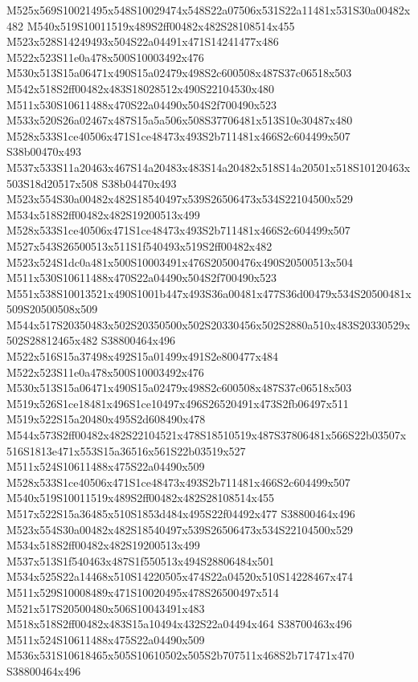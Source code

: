 \documentclass{article}
\begin{document}
\begin{multicols}{2}
M525x569S10021495x548S10029474x548S22a07506x531S22a11481x531S30a00482x482 M540x519S10011519x489S2ff00482x482S28108514x455 M523x528S14249493x504S22a04491x471S14241477x486 M522x523S11e0a478x500S10003492x476 M530x513S15a06471x490S15a02479x498S2c600508x487S37c06518x503 M542x518S2ff00482x483S18028512x490S22104530x480 M511x530S10611488x470S22a04490x504S2f700490x523 M533x520S26a02467x487S15a5a506x508S37706481x513S10e30487x480 M528x533S1ce40506x471S1ce48473x493S2b711481x466S2c604499x507 S38b00470x493 M537x533S11a20463x467S14a20483x483S14a20482x518S14a20501x518S10120463x503S18d20517x508 S38b04470x493 M523x554S30a00482x482S18540497x539S26506473x534S22104500x529 M534x518S2ff00482x482S19200513x499 M528x533S1ce40506x471S1ce48473x493S2b711481x466S2c604499x507 M527x543S26500513x511S1f540493x519S2ff00482x482 M523x524S1dc0a481x500S10003491x476S20500476x490S20500513x504 M511x530S10611488x470S22a04490x504S2f700490x523 M551x538S10013521x490S1001b447x493S36a00481x477S36d00479x534S20500481x509S20500508x509 M544x517S20350483x502S20350500x502S20330456x502S2880a510x483S20330529x502S28812465x482 S38800464x496 M522x516S15a37498x492S15a01499x491S2e800477x484 M522x523S11e0a478x500S10003492x476 M530x513S15a06471x490S15a02479x498S2c600508x487S37c06518x503 M519x526S1ce18481x496S1ce10497x496S26520491x473S2fb06497x511 M519x522S15a20480x495S2d608490x478 M544x573S2ff00482x482S22104521x478S18510519x487S37806481x566S22b03507x516S1813e471x553S15a36516x561S22b03519x527 M511x524S10611488x475S22a04490x509 M528x533S1ce40506x471S1ce48473x493S2b711481x466S2c604499x507 M540x519S10011519x489S2ff00482x482S28108514x455 M517x522S15a36485x510S1853d484x495S22f04492x477 S38800464x496 M523x554S30a00482x482S18540497x539S26506473x534S22104500x529 M534x518S2ff00482x482S19200513x499 M537x513S1f540463x487S1f550513x494S28806484x501 M534x525S22a14468x510S14220505x474S22a04520x510S14228467x474 M511x529S10008489x471S10020495x478S26500497x514 M521x517S20500480x506S10043491x483 M518x518S2ff00482x483S15a10494x432S22a04494x464 S38700463x496 M511x524S10611488x475S22a04490x509 M536x531S10618465x505S10610502x505S2b707511x468S2b717471x470 S38800464x496




\end{multicols}
\end{document}
